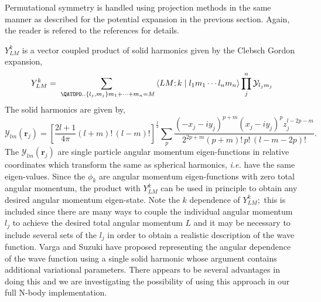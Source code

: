\documentclass[12pt,thmsa]{article}
\begin{document}
Permutational symmetry is handled using projection methods in the same
manner as described for the potential expansion in the previous section.
Again, the reader is refered to the references for details\cite
{Poshusta83,Kinghorn93,Kinghorn95b}.

$Y_{LM}^k$ is a vector coupled product of solid harmonics\cite{Biedenharn81}
given by the Clebsch Gordon expansion, 
\begin{equation}
Y_{LM}^k=\sum_{\,\,\QATOPD. . {\left\{ l_j,m_j\right\} }{m_1+\cdots
+m_n=M}}\left\langle LM;k\right. |\left. l_1m_1\cdots l_nm_n\right\rangle
\prod_j^n\mathcal{Y}_{l_jm_j}
\end{equation}
The solid harmonics are given by, 
\begin{equation}
\mathcal{Y}_{lm}\left( \mathbf{r}_j\right) =\left[ \frac{2l+1}{4\pi }\left(
l+m\right) !\,\left( l-m\right) !\right] ^{\frac 12}\sum_p\frac{\left(
-x_j-iy_j\right) ^{p+m}\left( x_j-iy_j\right) ^pz_j^{l-2p-m}}{2^{2p+m}\left(
p+m\right) !\,p!\,\left( l-m-2p\right) !}.
\end{equation}
The $\mathcal{Y}_{lm}\left( \mathbf{r}_j\right) $ are single particle
angular momentum eigen-functions in relative coordinates which transform the
same as spherical harmonics, \textit{i.e.} have the same eigen-values. Since
the $\phi _k$ are angular momentum eigen-functions with zero total angular
momentum, the product with $Y_{LM}^k$ can be used in principle to obtain any
desired angular momentum eigen-state. Note the $k$ dependence of $Y_{LM}^k;$
this is included since there are many ways to couple the individual angular
momentum $l_j$ to achieve the desired total angular momentum $L$ and it may
be necessary to include several sets of the $l_j$ in order to obtain a
realistic description of the wave function. Varga and Suzuki\cite{Varga95}
have proposed representing the angular dependence of the wave function using
a single solid harmonic whose argument contains additional variational
parameters. There appears to be several advantages in doing this and we are
investigating the possibility of using this approach in our full N-body
implementation.
\end{document}
